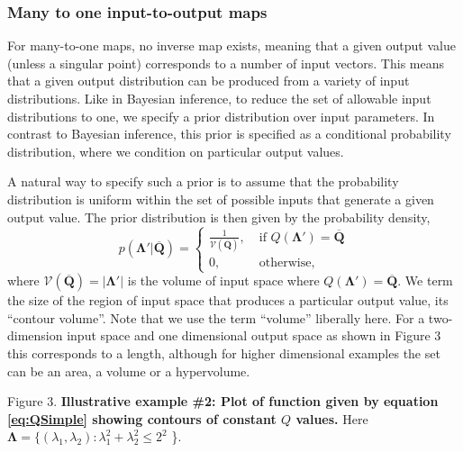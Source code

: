 \documentclass[10pt,letterpaper]{article}
\begin{document}
\subsubsection{Many to one input-to-output maps}
\label{sec:many-2-one}
For many-to-one maps, no inverse map exists, meaning that a given output value (unless a singular point) corresponds to a number of input vectors. This means that a given output distribution can be produced from a variety of input distributions. Like in Bayesian inference, to reduce the set of allowable input distributions to one, we specify a prior distribution over input parameters. In contrast to Bayesian inference, this prior is specified as a conditional probability distribution, where we condition on particular output values.

A natural way to specify such a prior is to assume that the probability distribution is uniform within the set of possible inputs that generate a given output value. The prior distribution is then given by the probability density,
%
\begin{equation}\label{eq:priorDef}
p(\boldsymbol{\Lambda}'|\overline{\boldsymbol{Q}})=
\begin{cases}
\frac{1}{\mathcal{V}(\overline{\boldsymbol{Q}})}, \; & \text{if } Q(\boldsymbol{\Lambda}')=\overline{\boldsymbol{Q}} \\
0,                                                & \text{otherwise},
\end{cases}
\end{equation}
%
where $\mathcal{V}(\overline{\boldsymbol{Q}}) = |\boldsymbol{\Lambda}'|$ is the volume of input space where $Q(\boldsymbol{\Lambda}')=\overline{\boldsymbol{Q}}$. We term the size of the region of input space that produces a particular output value, its ``contour volume''. Note that we use the term ``volume'' liberally here. For a two-dimension input space and one dimensional output space as shown in Figure 3 this corresponds to a length, although for higher dimensional examples the set can be an area, a volume or a hypervolume.

\vspace{0.5cm}

Figure 3. \textbf{Illustrative example \#2: Plot of function given by equation \eqref{eq:QSimple} showing contours of constant $Q$ values.}
Here $\boldsymbol{\Lambda} = \{ (\lambda_1,\lambda_2): \lambda_1^2+\lambda_2^2\leq2^2$ \}.
\end{document}
